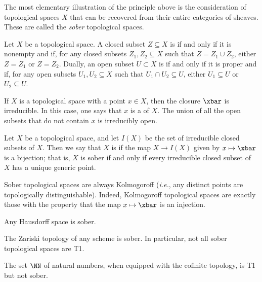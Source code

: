 The most elementary illustration of the principle above is the consideration of topological spaces $ X $ that can be recovered from their entire categories of sheaves.
These are called the \emph{sober} topological spaces.

\begin{dfn}
	Let $ X $ be a topological space.
	A closed subset $ Z \subseteq X $ is  if and only if it is nonempty and if, for any closed subsets $ Z_1, Z_2 \subseteq X $ such that $ Z = Z_1 \cup Z_2 $, either $ Z = Z_1 $ or $ Z = Z_2 $.
	Dually, an open subset $ U \subset X $ is  if and only if it is proper and if, for any open subsets $ U_1, U_2 \subseteq X $ such that $ U_1 \cap U_2 \subseteq U $, either $ U_1 \subseteq U $ or $ U_2 \subseteq U $.
\end{dfn}

\begin{exm}
	If $ X $ is a topological space with a point $ x \in X $, then the closure $ \xbar $ is irreducible.
	In this case, one says that $ x $ is a  of $ X $.
	The union of all the open subsets that do not contain $ x $ is irreducibly open.
\end{exm}

\begin{dfn}
	Let $ X $ be a topological space, and let $ I(X) $ be the set of irreducible closed subsets of $ X $.
	Then we say that $ X $ is  if the map $ X \to I(X) $ given by $ x \mapsto \xbar $ is a bijection;
	that is, $ X $ is sober if and only if every irreducible closed subset of $ X $ has a unique generic point.
\end{dfn}

\begin{nul}
	Sober topological spaces are always Kolmogoroff
	(\textit{i.e.}, any distinct points are topologically distinguishable).
	Indeed, Kolmogoroff topological spaces are exactly those with the property that the map $ x \mapsto \xbar $ is an injection.
\end{nul}

\begin{exm}
	Any Hausdorff space is sober.
\end{exm}

\begin{exm}
	The Zariski topology of any scheme is sober.
	In particular, not all sober topological spaces are T1.
\end{exm}

\begin{exm}
	The set $ \NN $ of natural numbers, when equipped with the cofinite topology, is T1 but not sober.
\end{exm}

